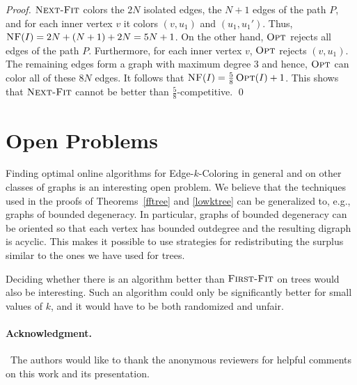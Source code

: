 \documentclass[smallextended]{svjour3}
\def\mck{{\sc Edge-$k$-Coloring}\xspace}
\newcommand{\NF}{\ensuremath{\operatorname{\textsc{Next-Fit}}}\xspace}
\newcommand{\FF}{\ensuremath{\operatorname{\textsc{First-Fit}}}\xspace}
\newcommand{\nf}{\ensuremath{\operatorname{\textsc{NF}}}\xspace}
\newcommand{\OPT}{\ensuremath{\operatorname{\textsc{Opt}}}\xspace}
\begin{document}
\begin{proof}
\NF colors the $2N$ isolated edges, the $N+1$ edges of the path $P$, and for each inner vertex $v$ it colors $(v,u_1)$ and $(u_1,u_1')$. Thus, $\nf(I)=2N+(N+1)+2N=5N+1$. On the other hand, $\OPT$ 
rejects all edges of the path $P$. Furthermore, for each inner vertex $v$, $\OPT$ rejects $(v, u_1)$.
The remaining edges form a graph with maximum degree $3$ and hence, \OPT can color all of these $8N$ edges.
It follows that $\nf(I)=\frac{5}{8}\OPT(I)+1$. This shows that $\NF$ cannot be better than $\frac{5}{8}$-competitive.
\qed\end{proof}


\section{Open Problems}
Finding optimal online algorithms for \mck in general and on other classes of graphs is an interesting open problem. We believe that the techniques used in the proofs of Theorems~\ref{fftree} and \ref{lowktree} can be generalized to, e.g., graphs of bounded degeneracy. In particular, graphs of bounded degeneracy can be oriented so that each vertex has bounded outdegree and the resulting digraph is acyclic. This makes it possible to use strategies for redistributing the surplus similar to the ones we have used for trees.

Deciding whether there is an algorithm better than \FF on trees would
also be interesting.
Such an algorithm could only be significantly better for small values
of $k$, and it would have to be both randomized and unfair.

\paragraph*{Acknowledgment.}
~The authors would like to thank the anonymous reviewers for helpful comments on this work and its presentation.




\end{document}
